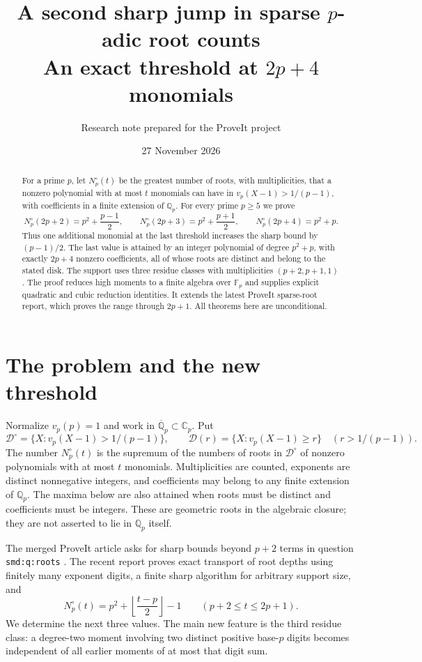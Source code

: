 \documentclass[11pt]{article}
\title{A second sharp jump in sparse $p$-adic root counts\\[3pt]\large An exact threshold at $2p+4$ monomials}
\author{Research note prepared for the ProveIt project}
\date{27 November 2026}
\theoremstyle{remark}\newtheorem{remark}[theorem]{Remark}
\begin{document}
\maketitle
\begin{abstract}
For a prime $p$, let $N_p^\circ(t)$ be the greatest number of roots, with multiplicities, that a nonzero polynomial with at most $t$ monomials can have in $v_p(X-1)>1/(p-1)$, with coefficients in a finite extension of $\mathbb Q_p$. For every prime $p\ge5$ we prove
\[
N_p^\circ(2p+2)=p^2+\frac{p-1}{2},\qquad
N_p^\circ(2p+3)=p^2+\frac{p+1}{2},\qquad
N_p^\circ(2p+4)=p^2+p.
\]
Thus one additional monomial at the last threshold increases the sharp bound by $(p-1)/2$. The last value is attained by an integer polynomial of degree $p^2+p$, with exactly $2p+4$ nonzero coefficients, all of whose roots are distinct and belong to the stated disk. The support uses three residue classes with multiplicities $(p+2,p+1,1)$. The proof reduces high moments to a finite algebra over $\mathbb F_p$ and supplies explicit quadratic and cubic reduction identities. It extends the latest ProveIt sparse-root report, which proves the range through $2p+1$. All theorems here are unconditional.
\end{abstract}

\section{The problem and the new threshold}
Normalize $v_p(p)=1$ and work in $\overline{\mathbb Q}_p\subset\mathbb C_p$. Put
\[
\mathcal D^\circ=\{X:v_p(X-1)>1/(p-1)\},\qquad
\mathcal D(r)=\{X:v_p(X-1)\ge r\}\quad(r>1/(p-1)).
\]
The number $N_p^\circ(t)$ is the supremum of the numbers of roots in $\mathcal D^\circ$ of nonzero polynomials with at most $t$ monomials. Multiplicities are counted, exponents are distinct nonnegative integers, and coefficients may belong to any finite extension of $\mathbb Q_p$. The maxima below are also attained when roots must be distinct and coefficients must be integers. These are geometric roots in the algebraic closure; they are not asserted to lie in $\mathbb Q_p$ itself.

The merged ProveIt article asks for sharp bounds beyond $p+2$ terms in question \texttt{smd:q:roots} \cite{article}. The recent report \cite{transport} proves exact transport of root depths using finitely many exponent digits, a finite sharp algorithm for arbitrary support size, and
\begin{equation}\label{eq:old}
N_p^\circ(t)=p^2+\left\lfloor\frac{t-p}{2}\right\rfloor-1
\qquad(p+2\le t\le2p+1).
\end{equation}
We determine the next three values. The main new feature is the third residue class: a degree-two moment involving two distinct positive base-$p$ digits becomes independent of all earlier moments of at most that digit sum.
\end{document}
